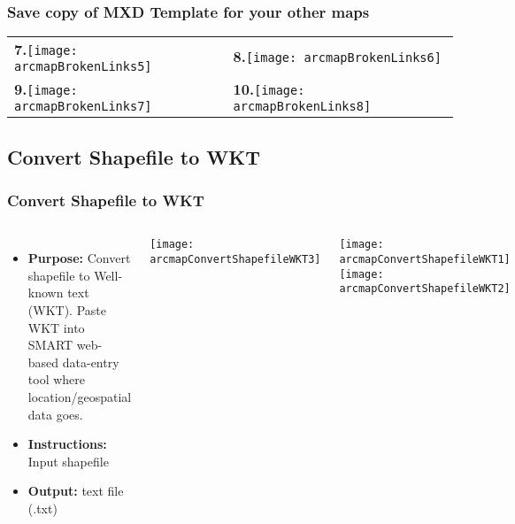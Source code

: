 \documentclass[t]{beamer} %
\begin{document}

\begin{frame}
\frametitle{Save copy of MXD Template for your other maps}

\vspace{-0.2in}
\begin{table}
\begin{tabular}{l l}
\textbf{7.}\texttt{[image: arcmapBrokenLinks5]} & \textbf{8.}\texttt{[image: arcmapBrokenLinks6]}\\ 
\textbf{9.}\texttt{[image: arcmapBrokenLinks7]} & \textbf{10.}\texttt{[image: arcmapBrokenLinks8]}\\ 
\end{tabular}
\end{table}
\end{frame}


\subsection{Convert Shapefile to WKT}
\begin{frame}
\frametitle{Convert Shapefile to WKT}

\begin{columns}[t]
\begin{itemize}
\item\textbf{Purpose: } Convert shapefile to Well-known text (WKT). Paste WKT into SMART web-based data-entry tool where location/geospatial data goes.
\item\textbf{Instructions: }Input shapefile
\item\textbf{Output: }text file (.txt)
\end{itemize}
\texttt{[image: arcmapConvertShapefileWKT3]}

\texttt{[image: arcmapConvertShapefileWKT1]}\\
\vspace{0.3in}
\texttt{[image: arcmapConvertShapefileWKT2]}
\end{columns}
\end{frame}

\end{document}
